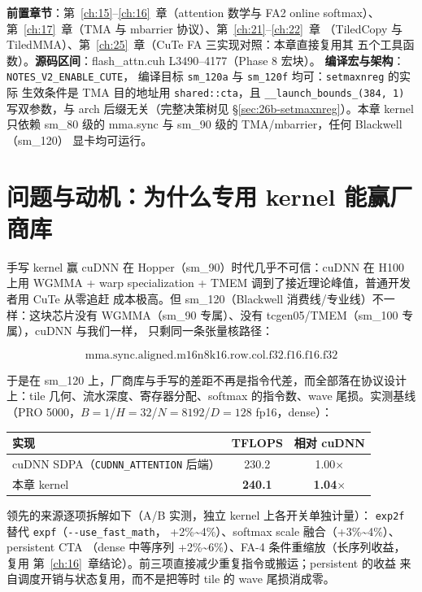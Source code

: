 \textbf{前置章节}：第~\ref{ch:15}--\ref{ch:16}~章（attention 数学与 FA2 online
softmax）、第~\ref{ch:17}~章（TMA 与 mbarrier 协议）、第~\ref{ch:21}--\ref{ch:22}~章
（TiledCopy 与 TiledMMA）、第~\ref{ch:25}~章（CuTe FA 三实现对照：本章直接复用其
五个工具函数）。\textbf{源码区间}：flash\_attn.cuh L3490--4177（Phase 8 宏块）。
\textbf{编译宏与架构}：\texttt{NOTES\_\allowbreak{}V2\_\allowbreak{}ENABLE\_\allowbreak{}CUTE}，
编译目标 \texttt{sm\_120a} 与 \texttt{sm\_120f} 均可：\texttt{setmaxnreg} 的实际
生效条件是 TMA 目的地址用 \texttt{shared::cta}，且 \texttt{\_\_launch\_\allowbreak{}bounds\_\allowbreak{}(384,~1)}
写双参数，与 arch 后缀无关（完整决策树见 \S\ref{sec:26b-setmaxnreg}）。本章 kernel
只依赖 sm\_80 级的 mma.sync 与 sm\_90 级的 TMA/mbarrier，任何 Blackwell（sm\_120）
显卡均可运行。

\section{问题与动机：为什么专用 kernel 能赢厂商库}\label{sec:26b-motivation}

手写 kernel 赢 cuDNN 在 Hopper（sm\_90）时代几乎不可信：cuDNN 在 H100 上用
WGMMA + warp specialization + TMEM 调到了接近理论峰值，普通开发者用 CuTe 从零追赶
成本极高。但 sm\_120（Blackwell 消费线/专业线）不一样：这块芯片没有
WGMMA（sm\_90 专属）、没有 tcgen05/TMEM（sm\_100 专属），cuDNN 与我们一样，
只剩同一条张量核路径：

\begin{equation*}
  \text{mma.sync.aligned.m16n8k16.row.col.f32.f16.f16.f32}
\end{equation*}

于是在 sm\_120 上，厂商库与手写的差距不再是指令代差，而全部落在协议设计
上：tile 几何、流水深度、寄存器分配、softmax 的指令数、wave 尾损。实测基线
（PRO 5000，$B{=}1$/$H{=}32$/$N{=}8192$/$D{=}128$ fp16，dense）：

\begin{center}
\begin{tabular}{lcc}
\toprule
实现 & TFLOPS & 相对 cuDNN \\
\midrule
cuDNN SDPA（\texttt{CUDNN\_ATTENTION} 后端） & 230.2 & 1.00$\times$ \\
本章 kernel & \textbf{240.1} & \textbf{1.04$\times$} \\
\bottomrule
\end{tabular}
\end{center}

领先的来源逐项拆解如下（A/B 实测，独立 kernel 上各开关单独计量）：
\texttt{exp2f} 替代 \texttt{expf}（\texttt{-{}-use\_\allowbreak{}fast\_\allowbreak{}math}，
+2\%\textasciitilde4\%）、softmax scale 融合（+3\%\textasciitilde4\%）、persistent CTA
（dense 中等序列 +2\%\textasciitilde6\%）、FA-4 条件重缩放（长序列收益，复用
第~\ref{ch:16}~章结论）。前三项直接减少重复指令或搬运；persistent 的收益
来自调度开销与状态复用，而不是把等时 tile 的 wave 尾损消成零。

